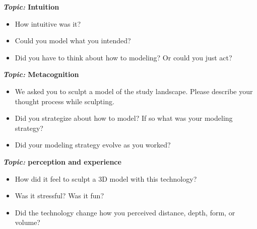 \documentclass[Afour,sagev,times]{sagej} %
\begin{document}
\begin{sm}
\textbf{\emph{Topic:} Intuition}
\begin{itemize}
\item How intuitive was it? 
\item Could you model what you intended?
\item Did you have to think about how to modeling? Or could you just act?
\end{itemize}

\textbf{\emph{Topic:} Metacognition}
\begin{itemize}
\item We asked you to sculpt a model of the study landscape. Please describe your thought process while sculpting. 
\item Did you strategize about how to model? If so what was your modeling strategy? 
\item Did your modeling strategy evolve as you worked?
\end{itemize}

\textbf{\emph{Topic:} perception and experience}
\begin{itemize}
\item How did it feel to sculpt a 3D model with this technology?
\item Was it stressful? Was it fun?
\item Did the technology change how you perceived distance, depth, form, or volume?  
\end{itemize}

\end{sm}




 
\end{document}
